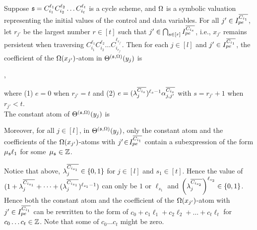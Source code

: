 \begin{lemma}\label{prop-cycle-schm}
Suppose ${\mathfrak{s} }=C_{i_1}^{\ell_1} C_{i_2}^{\ell_2} \dots C_{i_t}^{\ell_t}$ is a cycle scheme, and $\Omega$ is a symbolic valuation representing the initial values of the control and data variables. 
For all $j' \in  I^{\overline{C_{i_{1}}}}_{pe}$, let $r_{j'}$ be the largest number $r \in [t]$ such that $j'\in\bigcap_{s\in[r]} I^{\overline{C_{i_{s}}}}_{pe}$, i.e., $x_{j'}$ remains persistent when traversing $C_{i_1}^{\ell_1} C_{i_2}^{\ell_2} \dots C_{i_{r_{j'}}}^{\ell_{r_{j'}}}$.
Then for each $j\in [l]$ and $j' \in  I^{\overline{C_{i_{1}}}}_{pe}$, the coefficient of the $\Omega(x_{j'})$-atom in $\Theta^{({\mathfrak{s} },\Omega)}(y_j)$ is 
\begin{center}
,
\end{center}
where (1) $e\!=\!0$ when $r_{j'}\!=\!t$ and (2) $e=(\lambda^{\overline{C_{i_s}}}_{j})^{\ell_s-1} \alpha^{\overline{C_{i_{s}}}}_{j,j'}$ with $s=r_{j'}+1$ when $r_{j'}<t$.\\
The constant atom of $\Theta^{({\mathfrak{s} },\Omega)}(y_j)$ is 
\begin{center}
\end{center}
Moreover, for all $j\!\in\! [l]$, in $\Theta^{({\mathfrak{s} },\Omega)}(y_j)$, only the constant atom and the coefficients of the $\Omega(x_{j'})$-atoms with $j' \!\in\!I^{\overline{C_{i_{1}}}}_{pe}$ contain a subexpression of the form $ \mu_{\mathfrak{s} } \ell_1$ for some~$\mu_{\mathfrak{s} }\in {\mathbb{Z} }$.
\end{lemma}
Notice that above, $\lambda^{\overline{C_{i_{s_1}}}}_j\in\{0,1\}$ for $j\in[l]$ and $s_1\in [t]$. Hence the value of $(1+\lambda^{\overline{C_{i_{s_1}}}}_{j} + \dots + (\lambda^{\overline{C_{i_{s_1}}}}_{j})^{\ell_{s_1}-1} )$ can only be $1$ or $\ell_{s_1}$ and $\left(\lambda^{\overline{C_{i_{s_2}}}}_{j}\right)^{\ell_{s_2}}\in\{0,1\}$.
Hence both the constant atom and the coefficient of the $\Omega(x_{j'})$-atom with $j'\in I^{\overline{C_{i_{1}}}}_{pe}$ can be rewritten to the form of $c_0+c_1\ell_1+c_2\ell_2+\dots+c_t\ell_t$ for $c_0\ldots c_t\in {\mathbb{Z} }$. Note that some of $c_0\ldots c_t$ might be zero.




